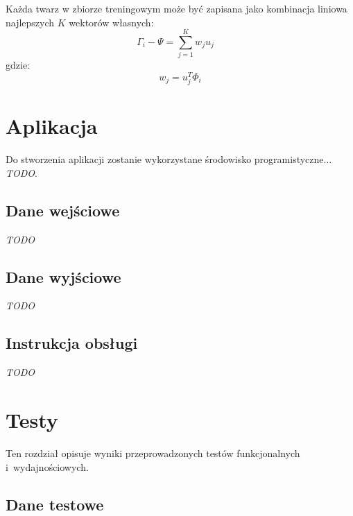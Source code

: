 \documentclass[a4paper,titlepage]{article}
\theoremstyle{break}
\begin{document}
Każda twarz w zbiorze treningowym może być zapisana jako kombinacja liniowa najlepszych $K$ wektorów własnych:
$$\Gamma_i-\Psi=\sum\limits_{j=1}^K w_j u_j\quad$$
gdzie:
$$w_j=u_j^T\Phi_i$$


\section{Aplikacja}

Do stworzenia aplikacji zostanie wykorzystane środowisko programistyczne... \emph{TODO}.


\subsection{Dane wejściowe}

\emph{TODO}


\subsection{Dane wyjściowe}

\emph{TODO}


\subsection{Instrukcja obsługi}

\emph{TODO}


\section{Testy}

Ten rozdział opisuje wyniki przeprowadzonych testów funkcjonalnych i~wydajnościowych.


\subsection{Dane testowe}
\end{document}
